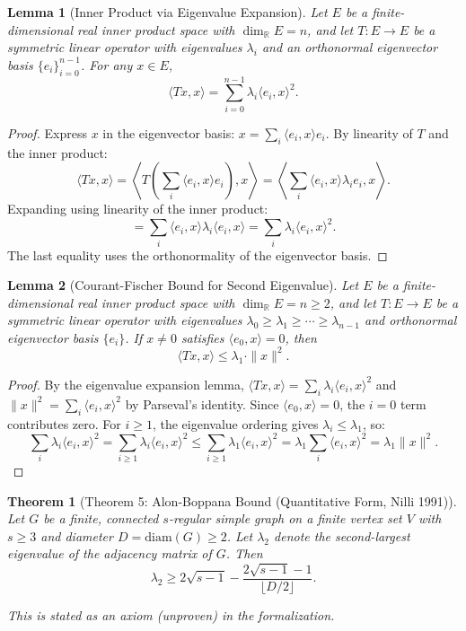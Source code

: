 \documentclass[11pt]{article}
\theoremstyle{plain}
\newtheorem*{theorem}{Theorem}
\newtheorem*{lemma}{Lemma}
\theoremstyle{definition}
\theoremstyle{remark}
\begin{document}
\begin{lemma}[Inner Product via Eigenvalue Expansion]
Let $E$ be a finite-dimensional real inner product space with $\dim_{\mathbb{R}} E = n$, and let $T : E \to E$ be a symmetric linear operator with eigenvalues $\lambda_i$ and an orthonormal eigenvector basis $\{e_i\}_{i=0}^{n-1}$. For any $x \in E$,
\[
\langle Tx, x \rangle = \sum_{i=0}^{n-1} \lambda_i \langle e_i, x \rangle^2.
\]
\end{lemma}

\begin{proof}
Express $x$ in the eigenvector basis: $x = \sum_{i} \langle e_i, x \rangle e_i$. By linearity of $T$ and the inner product:
\[
\langle Tx, x \rangle = \left\langle T\left(\sum_i \langle e_i, x \rangle e_i\right), x \right\rangle = \left\langle \sum_i \langle e_i, x \rangle \lambda_i e_i, x \right\rangle.
\]
Expanding using linearity of the inner product:
\[
= \sum_i \langle e_i, x \rangle \lambda_i \langle e_i, x \rangle = \sum_i \lambda_i \langle e_i, x \rangle^2.
\]
The last equality uses the orthonormality of the eigenvector basis.
\end{proof}

\begin{lemma}[Courant-Fischer Bound for Second Eigenvalue]
Let $E$ be a finite-dimensional real inner product space with $\dim_{\mathbb{R}} E = n \geq 2$, and let $T : E \to E$ be a symmetric linear operator with eigenvalues $\lambda_0 \geq \lambda_1 \geq \cdots \geq \lambda_{n-1}$ and orthonormal eigenvector basis $\{e_i\}$. If $x \neq 0$ satisfies $\langle e_0, x \rangle = 0$, then
\[
\langle Tx, x \rangle \leq \lambda_1 \cdot \|x\|^2.
\]
\end{lemma}

\begin{proof}
By the eigenvalue expansion lemma, $\langle Tx, x \rangle = \sum_i \lambda_i \langle e_i, x \rangle^2$ and $\|x\|^2 = \sum_i \langle e_i, x \rangle^2$ by Parseval's identity. Since $\langle e_0, x \rangle = 0$, the $i = 0$ term contributes zero. For $i \geq 1$, the eigenvalue ordering gives $\lambda_i \leq \lambda_1$, so:
\[
\sum_i \lambda_i \langle e_i, x \rangle^2 = \sum_{i \geq 1} \lambda_i \langle e_i, x \rangle^2 \leq \sum_{i \geq 1} \lambda_1 \langle e_i, x \rangle^2 = \lambda_1 \sum_i \langle e_i, x \rangle^2 = \lambda_1 \|x\|^2.
\]
\end{proof}

\begin{theorem}[Theorem 5: Alon-Boppana Bound (Quantitative Form, Nilli 1991)]
Let $G$ be a finite, connected $s$-regular simple graph on a finite vertex set $V$ with $s \geq 3$ and diameter $D = \text{diam}(G) \geq 2$. Let $\lambda_2$ denote the second-largest eigenvalue of the adjacency matrix of $G$. Then
\[
\lambda_2 \geq 2\sqrt{s-1} - \frac{2\sqrt{s-1} - 1}{\lfloor D/2 \rfloor}.
\]

\textit{This is stated as an axiom (unproven) in the formalization.}
\end{theorem}
\end{document}
